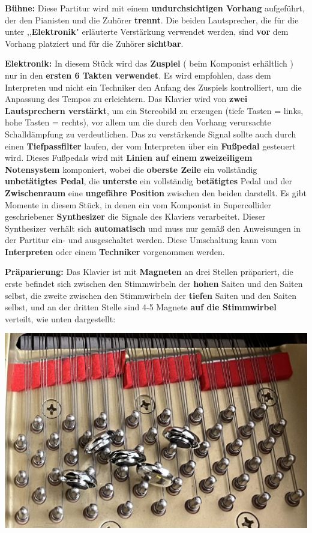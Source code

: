 \documentclass[12pt]{article}
\newcommand*\circled[1]{\tikz[baseline=(char.base)]{
            \node[shape=circle,draw,inner sep=1pt] (char) {#1};}}
\begin{document}
\begingroup
\textbf{Bühne: \circled{1}} Diese Partitur wird mit einem \textbf{undurchsichtigen Vorhang} aufgeführt, der den Pianisten und die Zuhörer \textbf{trennt}. Die beiden Lautsprecher, die für die unter ,,\textbf{Elektronik}" erläuterte Verstärkung verwendet werden, sind \textbf{vor} dem Vorhang platziert und für die Zuhörer \textbf{sichtbar}.
\endgroup

\begingroup
\textbf{Elektronik: \circled{1}} In diesem Stück wird das \textbf{Zuspiel} ( beim Komponist erhältlich ) nur in den \textbf{ersten 6 Takten verwendet}. Es wird empfohlen, dass dem Interpreten und nicht ein Techniker den Anfang des Zuspiels kontrolliert, um die Anpassung des Tempos zu erleichtern. \textbf{\circled{2}} Das Klavier wird von \textbf{zwei Lautsprechern verstärkt}, um ein Stereobild zu erzeugen (tiefe Tasten = links, hohe Tasten = rechts), vor allem um die durch den Vorhang verursachte Schalldämpfung zu verdeutlichen. \textbf{\circled{3}} Das zu verstärkende Signal sollte auch durch einen \textbf{Tiefpassfilter} laufen, der vom Interpreten über ein \textbf{Fußpedal} gesteuert wird. Dieses Fußpedals wird mit \textbf{Linien auf einem zweizeiligem Notensystem} komponiert, wobei die \textbf{oberste Zeile} ein vollständig \textbf{unbetätigtes Pedal}, die \textbf{unterste} ein vollständig \textbf{betätigtes} Pedal und der \textbf{Zwischenraum} eine \textbf{ungefähre Position} zwischen den beiden darstellt. \textbf{\circled{4}} Es gibt Momente in diesem Stück, in denen ein vom Komponist in Supercollider geschriebener \textbf{Synthesizer} die Signale des Klaviers verarbeitet. Dieser Synthesizer verhält sich \textbf{automatisch} und muss nur gemäß den Anweisungen in der Partitur ein- und ausgeschaltet werden. Diese Umschaltung kann vom \textbf{Interpreten} oder einem \textbf{Techniker} vorgenommen werden.
\endgroup

\begingroup
\textbf{Präparierung: \circled{1}} Das Klavier ist mit \textbf{Magneten} an drei Stellen präpariert, die erste befindet sich zwischen den Stimmwirbeln der \textbf{hohen} Saiten und den Saiten selbst, die zweite zwischen den Stimmwirbeln der \textbf{tiefen} Saiten und den Saiten selbst, und an der dritten Stelle sind 4-5 Magnete \textbf{auf  die Stimmwirbel} verteilt, wie unten dargestellt:

\begin{center}
\includegraphics[scale=0.70]{magnets.jpg}
\end{center}
\end{document}
